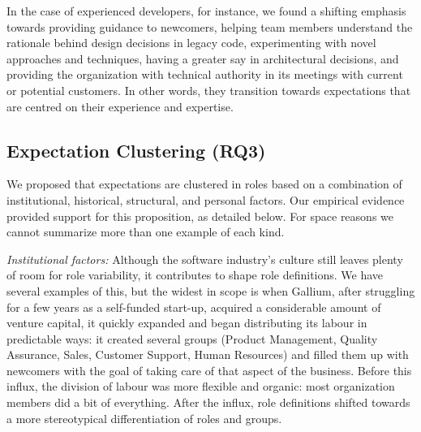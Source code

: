 \documentclass[10pt, conference, compsocconf]{IEEEtran}
\begin{document}
In the case of experienced developers, for instance, we found a shifting emphasis towards providing guidance to newcomers, helping team members understand the rationale behind design decisions in legacy code, experimenting with novel approaches and techniques, having a greater say in architectural decisions, and providing the organization with technical authority in its meetings with current or potential customers. In other words, they transition towards expectations that are centred on their experience and expertise.




\subsection{Expectation Clustering (RQ3)}

We proposed that expectations are clustered in roles based on a combination of institutional, historical, structural, and personal factors. Our empirical evidence provided support for this proposition, as detailed below. For space reasons we cannot summarize more than one example of each kind.

\emph{Institutional factors:} Although the software industry's culture still leaves plenty of room for role variability, it contributes to shape role definitions. We have several examples of this, but the widest in scope is when Gallium, after struggling for a few years as a self-funded start-up, acquired a considerable amount of venture capital, it quickly expanded and began distributing its labour in predictable ways: it created several groups (Product Management, Quality Assurance, Sales, Customer Support, Human Resources) and filled them up with newcomers with the goal of taking care of that aspect of the business. Before this influx, the division of labour was more flexible and organic: most organization members did a bit of everything. After the influx, role definitions shifted towards a more stereotypical differentiation of roles and groups.
\end{document}
